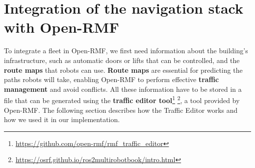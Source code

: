\chapter{Integration of the navigation stack with Open-RMF}
To integrate a fleet in Open-RMF, we first need information about the building's infrastructure, such as automatic doors or lifts that can be controlled, and the \textbf{route maps} that robots can use. \textbf{Route maps} are essential for predicting the paths robots will take, enabling Open-RMF to perform effective \textbf{traffic management} and avoid conflicts. All these information have to be stored in a file that can be generated using the \textbf{traffic editor tool}\footnote{\href{https://github.com/open-rmf/rmf\_traffic\_editor}{https://github.com/open-rmf/rmf\_traffic\_editor}}  \footnote{\href{https://osrf.github.io/ros2multirobotbook/intro.html}{https://osrf.github.io/ros2multirobotbook/intro.html}}, a tool provided by Open-RMF. The following section describes how the Traffic Editor works and how we used it in our implementation.
